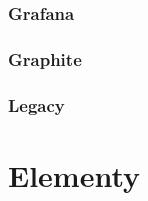 \documentclass{beamer}
\begin{document}
            \subsubsection{Grafana}
            
            \subsubsection{Graphite}
            
            \subsubsection{Legacy}
            
    
	\section{Elementy}
		
		
       
       

% 
\end{document}
